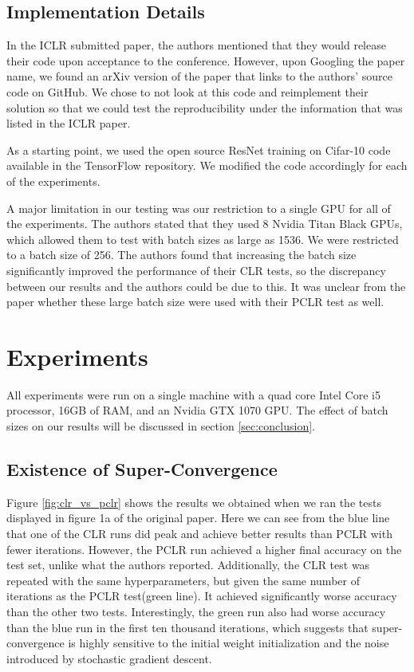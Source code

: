 \documentclass[10pt,twocolumn,letterpaper]{article}
\begin{document}
\subsection{Implementation Details}
In the ICLR submitted paper, the authors mentioned that they would release
their code upon acceptance to the conference. However, upon Googling the paper
name, we found an arXiv version of the paper that links to the authors' source
code on GitHub. We chose to not look at this code and reimplement their
solution so that we could test the reproducibility under the information
that was listed in the ICLR paper.

As a starting point, we used the open source ResNet training on Cifar-10 code
available in the TensorFlow \cite{TensorFlow} repository. We modified the code
accordingly for each of the experiments.

A major limitation in our testing was our restriction to a single GPU for all
of the experiments. The authors stated that they used 8 Nvidia Titan Black
GPUs, which allowed them to test with batch sizes as large as 1536. We were
restricted to a batch size of 256. The authors found that increasing the batch
size significantly improved the performance of their CLR tests, so the
discrepancy between our results and the authors could be due to this. It was
unclear from the paper whether these large batch size were used with their PCLR
test as well.


\section{Experiments}
All experiments were run on a single machine with a quad core Intel Core i5
processor, 16GB of RAM, and an Nvidia GTX 1070 GPU. The effect of batch sizes
on our results will be discussed in section \ref{sec:conclusion}.

\subsection{Existence of Super-Convergence}
\label{sec:existence_of_super_convergence}
Figure \ref{fig:clr_vs_pclr} shows the results we obtained when we ran the
tests displayed in figure 1a of the original paper. Here we can see from the
blue line that one of the CLR runs did peak and achieve better results than
PCLR with fewer iterations. However, the PCLR run achieved a higher final
accuracy on the test set, unlike what the authors reported. Additionally, the
CLR test was repeated with the same hyperparameters, but given the same number
of iterations as the PCLR test(green line). It achieved significantly worse
accuracy than the other two tests. Interestingly, the green run also had worse
accuracy than the blue run in the first ten thousand iterations, which suggests
that super-convergence is highly sensitive to the initial weight initialization
and the noise introduced by stochastic gradient descent.
\end{document}
